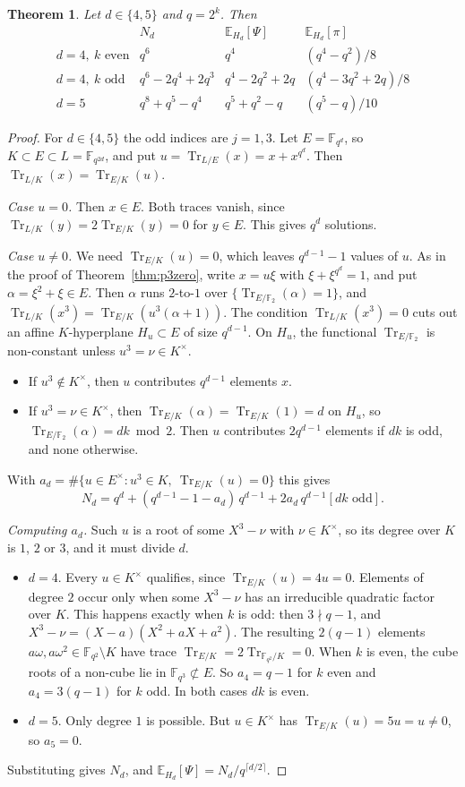 \documentclass[11pt,a4paper]{amsart}
\newtheorem{theorem}{Theorem}[section]
\theoremstyle{definition}
\theoremstyle{remark}
\newcommand{\F}{\mathbb{F}}
\newcommand{\Tr}{\operatorname{Tr}}
\newcommand{\E}{\mathbb{E}}
\begin{document}
\begin{theorem}\label{thm:d45}
Let $d\in\{4,5\}$ and $q=2^k$. Then
\[
\begin{array}{c|c|c|c}
 & N_d & \E_{H_d}[\Psi] & \E_{H_d}[\pi]\\\hline
d=4,\ k\text{ even} & q^6 & q^4 & (q^4-q^2)/8\\
d=4,\ k\text{ odd} & q^6-2q^4+2q^3 & q^4-2q^2+2q & (q^4-3q^2+2q)/8\\
d=5 & q^8+q^5-q^4 & q^5+q^2-q & (q^5-q)/10
\end{array}
\]
\end{theorem}

\begin{proof}
For $d\in\{4,5\}$ the odd indices are $j=1,3$. Let $E=\F_{q^d}$, so $K\subset E\subset L=\F_{q^{2d}}$, and put
$u=\Tr_{L/E}(x)=x+x^{q^d}$. Then $\Tr_{L/K}(x)=\Tr_{E/K}(u)$.

\emph{Case $u=0$.} Then $x\in E$. Both traces vanish, since $\Tr_{L/K}(y)=2\Tr_{E/K}(y)=0$ for $y\in E$. This gives
$q^d$ solutions.

\emph{Case $u\ne0$.} We need $\Tr_{E/K}(u)=0$, which leaves $q^{d-1}-1$ values of $u$. As in the proof of Theorem~\ref{thm:p3zero},
write $x=u\xi$ with $\xi+\xi^{q^d}=1$, and put $\alpha=\xi^2+\xi\in E$. Then $\alpha$ runs $2$-to-$1$ over
$\{\Tr_{E/\F_2}(\alpha)=1\}$, and $\Tr_{L/K}(x^3)=\Tr_{E/K}(u^3(\alpha+1))$. The condition $\Tr_{L/K}(x^3)=0$ cuts out
an affine $K$-hyperplane $H_u\subset E$ of size $q^{d-1}$. On $H_u$, the functional $\Tr_{E/\F_2}$ is non-constant
unless $u^3=\nu\in K^\times$.
\begin{itemize}
\item If $u^3\notin K^\times$, then $u$ contributes $q^{d-1}$ elements $x$.
\item If $u^3=\nu\in K^\times$, then $\Tr_{E/K}(\alpha)=\Tr_{E/K}(1)=d$ on $H_u$, so
$\Tr_{E/\F_2}(\alpha)=dk\bmod2$. Then $u$ contributes $2q^{d-1}$ elements if $dk$ is odd, and none otherwise.
\end{itemize}
With $a_d=\#\{u\in E^\times:u^3\in K,\ \Tr_{E/K}(u)=0\}$ this gives
\[
N_d=q^d+(q^{d-1}-1-a_d)\,q^{d-1}+2a_d\,q^{d-1}[dk\text{ odd}].
\]

\emph{Computing $a_d$.} Such $u$ is a root of some $X^3-\nu$ with $\nu\in K^\times$, so its degree over $K$ is $1$, $2$
or $3$, and it must divide $d$.
\begin{itemize}
\item $d=4$. Every $u\in K^\times$ qualifies, since $\Tr_{E/K}(u)=4u=0$. Elements of degree $2$ occur only when some
$X^3-\nu$ has an irreducible quadratic factor over $K$. This happens exactly when $k$ is odd: then $3\nmid q-1$,
and $X^3-\nu=(X-a)(X^2+aX+a^2)$. The resulting $2(q-1)$ elements $a\omega,a\omega^2\in\F_{q^2}\setminus K$ have trace
$\Tr_{E/K}=2\Tr_{\F_{q^2}/K}=0$. When $k$ is even, the cube roots of a non-cube lie in $\F_{q^3}\not\subset E$. So
$a_4=q-1$ for $k$ even and $a_4=3(q-1)$ for $k$ odd. In both cases $dk$ is even.
\item $d=5$. Only degree $1$ is possible. But $u\in K^\times$ has $\Tr_{E/K}(u)=5u=u\ne0$, so $a_5=0$.
\end{itemize}
Substituting gives $N_d$, and $\E_{H_d}[\Psi]=N_d/q^{\lceil d/2\rceil}$.


\end{proof}
\end{document}
